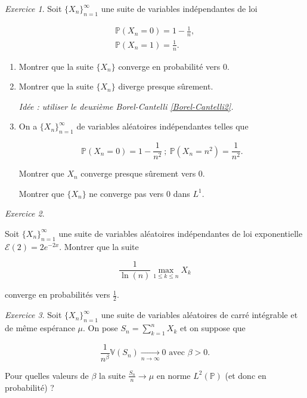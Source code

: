 \documentclass[french]{book}
\theoremstyle{definition}
\theoremstyle{remark}
\newtheorem{exo}{Exercice}
\newcommand{\biggg}{>}
\newcommand{\bg}{\biggg}
\begin{document}
\begin{exo}
  Soit \(\{ X_n \}_{n=1}^{\infty}\) une suite de variables indépendantes de loi

  \begin{gather*}
    \mathbb{P}(X_n = 0) = 1 - \frac{1}{n}, \\
    \mathbb{P}(X_n = 1) = \frac{1}{n}.
  \end{gather*}

  \begin{enumerate}
    \item Montrer que la suite \(\{ X_n \}\) converge en probabilité vers 0.
    \item Montrer que la suite \(\{ X_n \}\) diverge presque sûrement.

    \emph{Idée : utiliser le deuxième Borel-Cantelli \ref{Borel-Cantelli2}.}

    \item On a \(\{ X_n \}_{n=1}^{\infty}\) de variables aléatoires indépendantes telles que

    \[\mathbb{P}(X_n=0) = 1 - \frac{1}{n ^2} \ ; \ \mathbb{P}(X_n = n ^2) = \frac{1}{n ^2}.\]

    Montrer que \(X_n\) converge presque sûrement vers 0.

    Montrer que \(\{ X_n \}\) ne converge pas vers 0 dans \(L ^{1}\).
  \end{enumerate}
\end{exo}

\begin{exo}
  \

  Soit \(\{ X_n \}_{n=1}^{\infty}\) une suite de variables aléatoires indépendantes de loi exponentielle \(\mathscr{E}(2) = 2 e^{- 2x}\). Montrer que la suite

  \[\frac{1}{\ln(n)} \max _{1 \leq k \leq n} X_k\]

  converge en probabilités vers \(\frac{1}{2}\).
\end{exo}

\begin{exo}
  Soit \(\{ X_n \}_{n=1}^{\infty}\) une suite de variables aléatoires de carré intégrable et de même espérance \(\mu\). On pose \(S_n = \displaystyle \sum_{k=1}^{n}X_k\) et on suppose que

  \[\frac{1}{n ^{\beta}} \mathbb{V}(S_n) \underset{n \to \infty}{\longrightarrow} 0 \text{ avec } \beta \bg 0.\]

  Pour quelles valeurs de \(\beta\) la suite \(\frac{S_n}{n} \longrightarrow \mu\) en norme \(L ^2(\mathbb{P})\) (et donc en probabilité) ?
\end{exo}
\end{document}
